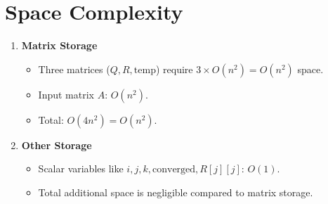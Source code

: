 \documentclass{article}
\begin{document}
\section{Space Complexity}

\begin{enumerate}
    \item \textbf{Matrix Storage}
    \begin{itemize}
        \item Three matrices (\( Q, R, \text{temp} \)) require \( 3 \times O(n^2) = O(n^2) \) space.
        \item Input matrix \( A \): \( O(n^2) \).
        \item Total: \( O(4n^2) = O(n^2) \).
    \end{itemize}
    
    \item \textbf{Other Storage}
    \begin{itemize}
        \item Scalar variables like \( i, j, k, \text{converged}, R[j][j] \): \( O(1) \).
        \item Total additional space is negligible compared to matrix storage.
    \end{itemize}
\end{enumerate}
\end{document}
